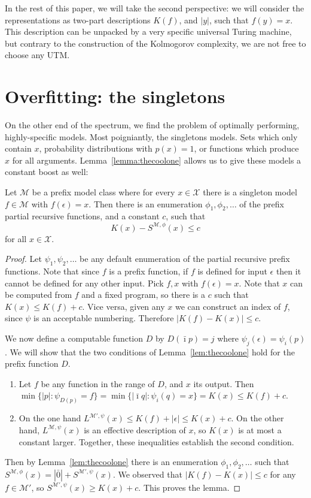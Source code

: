 \documentclass{style/llncs}
\newcommand{\M}{\mathscr M}
\newcommand{\X}{\mathscr X}
\begin{document}
In the rest of this paper, we will take the second perspective: we will consider the representations as two-part descriptions $K(f)$, and $|y|$, such that $f(y)=x$. This description can be unpacked by a very specific universal Turing machine, but contrary to the construction of the Kolmogorov complexity, we are not free to choose any UTM.

\section{Overfitting: the singletons}

On the other end of the spectrum, we find the problem of optimally performing, highly-specific models. Most poigniantly, the singletons models. Sets which only contain $x$, probability distributions with $p(x) = 1$, or functions which produce $x$ for all arguments. Lemma~\ref{lemma:thecoolone} allows us to give these models a constant boost as well:

\begin{lemma}[overfitting]
Let $\M$ be a prefix model class where for every $x\in\X$ there is a singleton model $f\in\M$ with $f(\epsilon)=x$. Then there is an enumeration $\phi_1,\phi_2,\ldots$ of the prefix partial recursive functions, and a constant $c$, such that
\[
K(x)-S^{\M,\phi}(x)\le c
\]
for all $x\in\X$.
\end{lemma}
\begin{proof}
Let $\psi_1,\psi_2,\ldots$ be any default enumeration of the partial recursive prefix functions. Note that since $f$ is a prefix function, if $f$ is defined for input $\epsilon$ then it cannot be defined for any other input. Pick $f,x$ with $f(\epsilon)=x$. Note that $x$ can be computed from $f$ and a fixed program, so there is a $c$ such that $K(x)\le K(f)+c$. Vice versa, given any $x$ we can construct an index of $f$, since $\psi$ is an acceptable numbering. Therefore $|K(f)-K(x)|\le c$.

We now define a computable function $D$ by $D(\bar\imath p)=j$ where $\psi_j(\epsilon) = \psi_i(p)$.  We will show that the two conditions of Lemma~\ref{lem:thecoolone} hold for the prefix function $D$.

\begin{enumerate}
\item Let $f$ be any function in the range of $D$, and $x$ its output. Then $\min\{|p|:\psi_{D(p)}=f\}=\min\{|\bar\imath q|:\psi_i(q)=x\}=K(x)\le K(f)+c$.
\item On the one hand $L^{\M',\psi}(x)\le K(f)+|\epsilon|\le K(x)+c$. On the other hand, $L^{\M,\psi}(x)$ is an effective description of $x$, so $K(x)$ is at most a constant larger.
Together, these inequalities establish the second condition.
\end{enumerate}

Then by Lemma~\ref{lem:thecoolone} there is an enumeration $\phi_1,\phi_2,\ldots$ such that $S^{\M,\phi}(x)=|\bar 0|+S^{\M',\psi}(x)$. We observed that $|K(f)-K(x)|\le c$ for any $f\in\M'$, so $S^{\M',\psi}(x)\ge K(x)+c$. This proves the lemma.
\end{proof}
\end{document}
